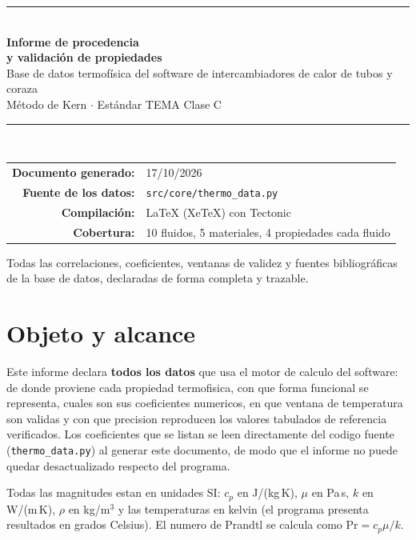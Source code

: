 \documentclass[11pt,a4paper]{article}
\begin{document}
\begin{titlepage}
\centering
\vspace*{2.2cm}
{\color{acento}\rule{\linewidth}{2pt}}\\[1.2cm]
{\Huge\bfseries\color{morado} Informe de procedencia\\[0.4em]
 y validaci\'on de propiedades}\\[0.8cm]
{\Large\color{acento} Base de datos termof\'isica del software de
 intercambiadores de calor de tubos y coraza}\\[0.5cm]
{\large\color{gristexto} M\'etodo de Kern $\cdot$ Est\'andar TEMA
 Clase C}\\[1.2cm]
{\color{acento}\rule{\linewidth}{1pt}}\\[1.5cm]
\begin{tabular}{rl}
\textbf{Documento generado:} & 17/10/2026 \\
\textbf{Fuente de los datos:} & \texttt{src/core/thermo\_data.py} \\
\textbf{Compilaci\'on:} & LaTeX (XeTeX) con Tectonic \\
\textbf{Cobertura:} & 10 fluidos, 5 materiales, 4 propiedades cada fluido \\
\end{tabular}
\vfill
{\small\color{gristexto} Todas las correlaciones, coeficientes,
 ventanas de validez y fuentes bibliogr\'aficas de la base de datos,
 declaradas de forma completa y trazable.}
\end{titlepage}

\tableofcontents
\newpage

\section{Objeto y alcance}
Este informe declara \textbf{todos los datos} que usa el motor de calculo del
software: de donde proviene cada propiedad termofisica, con que forma
funcional se representa, cuales son sus coeficientes numericos, en que
ventana de temperatura son validas y con que precision reproducen los
valores tabulados de referencia verificados. Los coeficientes que se listan
se leen directamente del codigo fuente (\texttt{thermo\_data.py}) al generar
este documento, de modo que el informe no puede quedar desactualizado
respecto del programa.

Todas las magnitudes estan en unidades SI: $c_p$ en J/(kg\,K), $\mu$ en
Pa\,s, $k$ en W/(m\,K), $\rho$ en kg/m$^3$ y las temperaturas en kelvin (el
programa presenta resultados en grados Celsius). El numero de Prandtl se
calcula como $\mathrm{Pr} = c_p \mu / k$.
\end{document}
